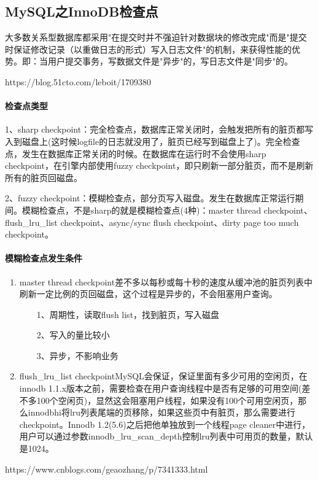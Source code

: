 \documentclass[../../../interview-questions.tex]{subfiles}
\begin{document}
\subsection{MySQL之InnoDB检查点}

大多数关系型数据库都采用"在提交时并不强迫针对数据块的修改完成"而是"提交时保证修改记录（以重做日志的形式）写入日志文件"的机制，来获得性能的优势。即：当用户提交事务，写数据文件是"异步"的，写日志文件是"同步"的。 


https://blog.51cto.com/leboit/1709380


\paragraph{检查点类型}

1、sharp checkpoint：完全检查点，数据库正常关闭时，会触发把所有的脏页都写入到磁盘上(这时候logfile的日志就没用了，脏页已经写到磁盘上了)。完全检查点，发生在数据库正常关闭的时候。在数据库在运行时不会使用sharp checkpoint，在引擎内部使用fuzzy checkpoint，即只刷新一部分脏页，而不是刷新所有的脏页回磁盘。

2、fuzzy checkpoint：模糊检查点，部分页写入磁盘。发生在数据库正常运行期间。模糊检查点，不是sharp的就是模糊检查点(4种)：master thread checkpoint、flush\_lru\_list checkpoint、async/sync flush checkpoint、dirty page too much checkpoint。

\paragraph{模糊检查点发生条件}

\begin{enumerate}
    \item {master thread checkpoint}差不多以每秒或每十秒的速度从缓冲池的脏页列表中刷新一定比例的页回磁盘，这个过程是异步的，不会阻塞用户查询。

    　　1、周期性，读取flush list，找到脏页，写入磁盘
    
    　　2、写入的量比较小
    
    　　3、异步，不影响业务

    \item {flush\_lru\_list checkpoint}MySQL会保证，保证里面有多少可用的空闲页，在innodb 1.1.x版本之前，需要检查在用户查询线程中是否有足够的可用空间(差不多100个空闲页)，显然这会阻塞用户线程，如果没有100个可用空闲页，那么innodbhi将lru列表尾端的页移除，如果这些页中有脏页，那么需要进行checkpoint。Innodb 1.2(5.6)之后把他单独放到一个线程page cleaner中进行，用户可以通过参数innodb\_lru\_scan\_depth控制lru列表中可用页的数量，默认是1024。


\end{enumerate}


https://www.cnblogs.com/geaozhang/p/7341333.html
\end{document}
